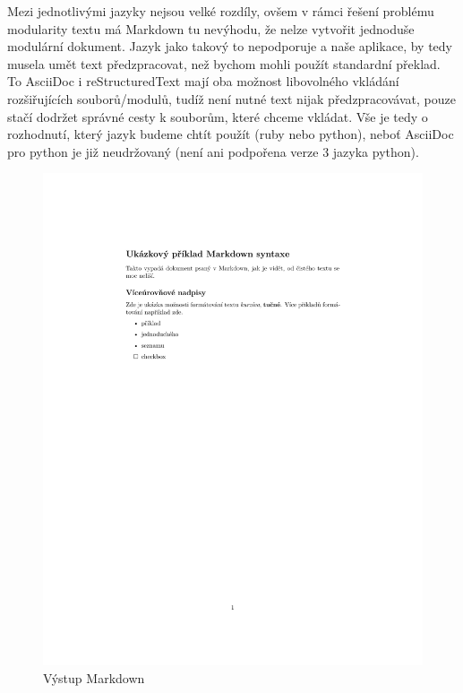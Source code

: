 Mezi jednotlivými jazyky nejsou velké rozdíly, ovšem v rámci řešení problému modularity textu má Markdown tu nevýhodu, že nelze vytvořit jednoduše modulární dokument.
Jazyk jako takový to nepodporuje a naše aplikace, by tedy musela umět text předzpracovat, než bychom mohli použít standardní překlad. To AsciiDoc i reStructuredText
mají oba možnost libovolného vkládání rozšiřujících souborů/modulů, tudíž není nutné text nijak předzpracovávat, pouze stačí dodržet správné cesty k souborům, které
chceme vkládat. Vše je tedy o rozhodnutí, který jazyk budeme chtít použít (ruby nebo python), neboť AsciiDoc pro python je již neudržovaný (není ani podpořena
verze 3 jazyka python).

\begin{figure}[h]
    \centering
    \includegraphics[width=\textwidth]{example.pdf}
    \caption{Výstup Markdown}
    \label{fig:markdown}
\end{figure}

